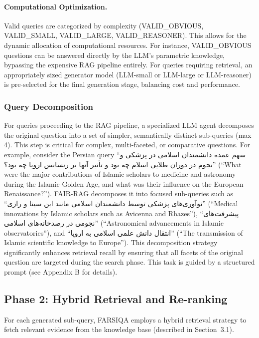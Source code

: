 \documentclass[11pt]{article}
\newcommand{\fa}[1]{\textfarsi{#1}}
\begin{document}
\paragraph{Computational Optimization.}
Valid queries are categorized by complexity (VALID\_OBVIOUS, VALID\_SMALL, VALID\_LARGE, VALID\_REASONER). This allows for the dynamic allocation of computational resources. For instance, VALID\_OBVIOUS questions can be answered directly by the LLM's parametric knowledge, bypassing the expensive RAG pipeline entirely. For queries requiring retrieval, an appropriately sized generator model (LLM-small or LLM-large or LLM-reasoner) is pre-selected for the final generation stage, balancing cost and performance. \cite{fairrag}

\subsubsection{Query Decomposition}

For queries proceeding to the RAG pipeline, a specialized LLM agent decomposes the original question into a set of simpler, semantically distinct sub-queries (max 4). This step is critical for complex, multi-faceted, or comparative questions. For example, consider the Persian query ``\fa{سهم عمده دانشمندان اسلامی در پزشکی و نجوم در دوران طلایی اسلام چه بود و تأثیر آنها بر رنسانس اروپا چه بود؟}'' (``What were the major contributions of Islamic scholars to medicine and astronomy during the Islamic Golden Age, and what was their influence on the European Renaissance?''). FAIR-RAG decomposes it into focused sub-queries such as ``\fa{نوآوری‌های پزشکی توسط دانشمندان اسلامی مانند ابن سینا و رازی}'' (``Medical innovations by Islamic scholars such as Avicenna and Rhazes''), ``\fa{پیشرفت‌های نجومی در رصدخانه‌های اسلامی}'' (``Astronomical advancements in Islamic observatories''), and ``\fa{انتقال دانش علمی اسلامی به اروپا}'' (``The transmission of Islamic scientific knowledge to Europe''). This decomposition strategy significantly enhances retrieval recall by ensuring that all facets of the original question are targeted during the search phase. \cite{fairrag} This task is guided by a structured prompt (see Appendix B for details).

\subsection{Phase 2: Hybrid Retrieval and Re-ranking}

For each generated sub-query, FARSIQA employs a hybrid retrieval strategy to fetch relevant evidence from the knowledge base (described in Section~3.1).
\end{document}
